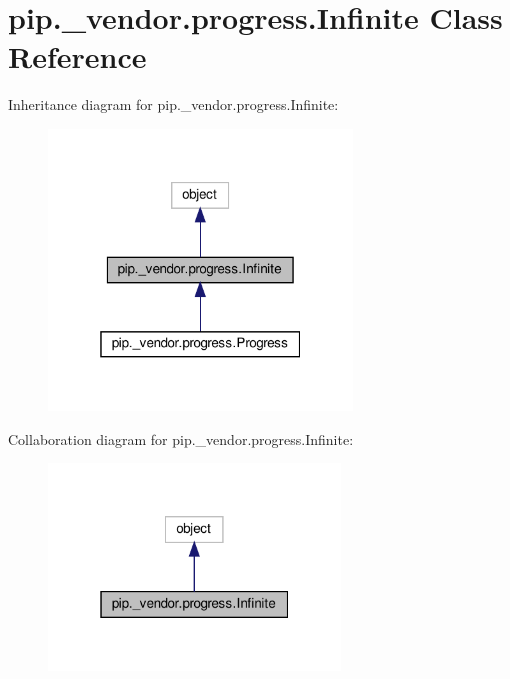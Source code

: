 \hypertarget{classpip_1_1__vendor_1_1progress_1_1Infinite}{}\section{pip.\+\_\+vendor.\+progress.\+Infinite Class Reference}
\label{classpip_1_1__vendor_1_1progress_1_1Infinite}


Inheritance diagram for pip.\+\_\+vendor.\+progress.\+Infinite\+:
\nopagebreak
\begin{figure}[H]
\begin{center}
\leavevmode
\includegraphics[width=229pt]{classpip_1_1__vendor_1_1progress_1_1Infinite__inherit__graph}
\end{center}
\end{figure}


Collaboration diagram for pip.\+\_\+vendor.\+progress.\+Infinite\+:
\nopagebreak
\begin{figure}[H]
\begin{center}
\leavevmode
\includegraphics[width=220pt]{classpip_1_1__vendor_1_1progress_1_1Infinite__coll__graph}
\end{center}
\end{figure}

